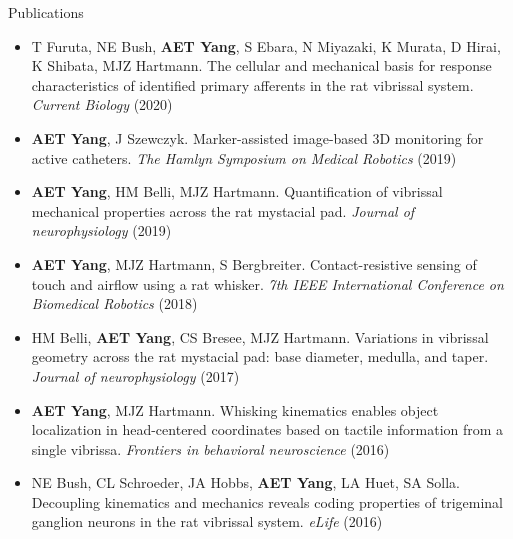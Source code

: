 \documentclass{resume} %
\begin{document}
	\begin{rSection}{Publications}
		\begin{itemize}[leftmargin=0em]
			\item T Furuta, NE Bush, \textbf{AET Yang}, S Ebara, N Miyazaki, K Murata, D Hirai, K Shibata, MJZ Hartmann. The cellular and mechanical basis for response characteristics of identified primary afferents in the rat vibrissal system. \textit{Current Biology} (2020)
			\item \textbf{AET Yang}, J Szewczyk. Marker-assisted image-based 3D monitoring for active catheters. \textit{The Hamlyn Symposium on Medical Robotics} (2019)
			\item \textbf{AET Yang}, HM Belli, MJZ Hartmann. Quantification of vibrissal mechanical properties across the rat mystacial pad. \textit{Journal of neurophysiology} (2019)
			\item \textbf{AET Yang}, MJZ Hartmann, S Bergbreiter. Contact-resistive sensing of touch and airflow using a rat whisker. \textit{7th IEEE International Conference on Biomedical Robotics} (2018)
			\item HM Belli, \textbf{AET Yang}, CS Bresee, MJZ Hartmann. Variations in vibrissal geometry across the rat mystacial pad: base diameter, medulla, and taper. \textit{Journal of neurophysiology} (2017)
			\item \textbf{AET Yang}, MJZ Hartmann. Whisking kinematics enables object localization in head-centered coordinates based on tactile information from a single vibrissa. \textit{Frontiers in behavioral neuroscience} (2016)
			\item NE Bush, CL Schroeder, JA Hobbs, \textbf{AET Yang}, LA Huet, SA Solla. Decoupling kinematics and mechanics reveals coding properties of trigeminal ganglion neurons in the rat vibrissal system. \textit{eLife} (2016)
			\vspace{-0mm}
		\end{itemize}
		
	\end{rSection}
	
\end{document}
